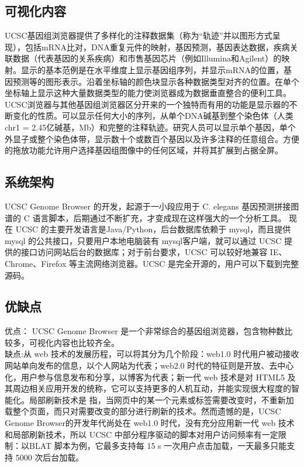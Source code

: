 			\subsection{可视化内容}		
			UCSC基因组浏览器提供了多样化的注释数据集（称为“轨迹”并以图形方式呈现），包括mRNA比对，DNA重复元件的映射，基因预测，基因表达数据，疾病关联数据（代表基因的关系疾病）和市售基因芯片（例如Illumina和Agilent）的映射。显示的基本范例是在水平维度上显示基因组序列，并显示mRNA的位置，基因预测等的图形表示。沿着坐标轴的颜色块显示各种数据类型对齐的位置。在单个坐标轴上显示这种大量数据类型的能力使浏览器成为数据垂直整合的便利工具。\\
			\indent UCSC浏览器与其他基因组浏览器区分开来的一个独特而有用的功能是显示器的不断变化的性质。可以显示任何大小的序列，从单个DNA碱基到整个染色体（人类chr1 = 2.45亿碱基，Mb）和完整的注释轨迹。研究人员可以显示单个基因，单个外显子或整个染色体带，显示数十个或数百个基因以及许多注释的任意组合。方便的拖放功能允许用户选择基因组图像中的任何区域，并将其扩展到占据全屏。
			\subsection{系统架构}		
			UCSC Genome Browser 的开发，起源于一小段应用于 C. elegans 基因预测拼接图谱的 C 语言脚本，后期通过不断扩充，才变成现在这样强大的一个分析工具。 现在 UCSC 的主要开发语言是Java/Python，后台数据库依赖于 mysql，而且提供mysql 的公共接口，只要用户本地电脑装有 mysql客户端，就可以通过 UCSC 提供的接口访问网站后台的数据库；对于前台要求，UCSC 可以较好地兼容 IE、Chrome、Firefox 等主流网络浏览器。UCSC 是完全开源的，用户可以下载到完整源码。
			\subsection{优缺点}
			优点：	UCSC Genome Browser 是一个非常综合的基因组浏览器，包含物种数比较多，可视化内容也比较齐全。\\
			\indent 缺点:从 web 技术的发展历程，可以将其分为几个阶段：web1.0 时代用户被动接收网站单向发布的信息，以个人网站为代表；web2.0 时代的特征则是开放、去中心化，用户参与信息发布和分享，以博客为代表；新一代 web 技术是对 HTML5 及其周边相关应用开发的统称，它可以支持更多的人机互动，并能实现很大程度的智能化。局部刷新技术是
			指，当网页中的某一个元素或标签需要改变时，不重新加载整个页面，而只对需要改变的部分进行刷新的技术。然而遗憾的是，UCSC Genome Browser的开发年代尚处在 web1.0 时代，没有充分应用新一代 web 技术和局部刷新技术，所以 UCSC 中部分程序驱动的脚本对用户访问频率有一定限制：以BLAT 脚本为例，它最多支持每 15 s 一次用户点击加载，一天最多只能支持 5000 次后台加载。